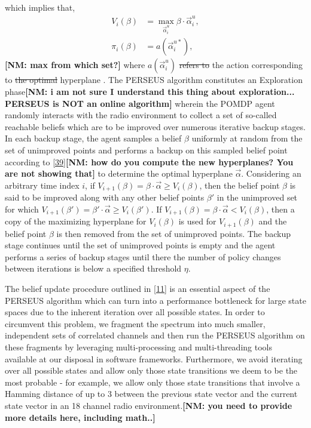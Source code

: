 \documentclass[10pt,twocolumn]{IEEEtran}
\newcommand{\sst}[1]{\st{#1}}
\newcommand{\nm}[1]{{\color{blue}\bf{[NM: #1]}}}
\newcommand{\add}[1]{{\color{red}{#1}}}
\begin{document}
which implies that,
\begin{equation}\label{40}
    \begin{split}
        V_i(\beta) &= \max_{\vec{\alpha}_{i}^u} \beta \cdot \vec{\alpha}_{i}^u,\\
        \pi_i(\beta) &= a(\vec{\alpha}_i^{u*}),
    \end{split}
\end{equation}
\nm{max from which set?}
where $a(\vec{\alpha}_i^{u})$\sst{ refers to} \add{is} the action corresponding to\sst{ the optimal} hyperplane \add{$\vec{\alpha}_i^{u}$}. The PERSEUS algorithm constitutes an Exploration phase\nm{i am not sure I understand this thing about exploration... PERSEUS is NOT an online algorithm} wherein the POMDP agent randomly interacts with the radio environment to collect a set of so-called reachable beliefs which are to be improved over numerous iterative backup stages. In each backup stage, the agent samples a belief $\beta$ uniformly at random from the set of unimproved points and performs a backup on this sampled belief point according to \eqref{39}\nm{how do you compute the new hyperplanes? You are not showing that} to determine the optimal hyperplane $\vec{\alpha}$. Considering an arbitrary time index $i$, if $V_{i+1}(\beta) = \beta \cdot \vec{\alpha} \geq V_{i}(\beta)$, then the belief point $\beta$ is said to be improved along with any other belief points $\beta'$ in the unimproved set for which $V_{i+1}(\beta') = \beta' \cdot \vec{\alpha} \geq V_{i}(\beta')$. If $V_{i+1}(\beta) = \beta \cdot \vec{\alpha} < V_{i}(\beta)$, then a copy of the maximizing hyperplane for $V_i(\beta)$ is used for $V_{i+1}(\beta)$ and the belief point $\beta$ is then removed from the set of unimproved points. The backup stage continues until the set of unimproved points is empty and the agent performs a series of backup stages until there the number of policy changes between iterations is below a specified threshold $\eta$.

The belief update procedure outlined in \eqref{11} is an essential aspect of the PERSEUS algorithm which can turn into a performance bottleneck for large state spaces due to the inherent iteration over all possible states. In order to circumvent this problem, we fragment the spectrum into much smaller, independent sets of correlated channels and then run the PERSEUS algorithm on these fragments by leveraging multi-processing and multi-threading tools available at our disposal in software frameworks. Furthermore, we avoid iterating over all possible states and allow only those state transitions we deem to be the most probable - for example, we allow only those state transitions that involve a Hamming distance of up to 3 between the previous state vector and the current state vector in an 18 channel radio environment.\nm{ you need to provide more details here, including math..}
\end{document}
